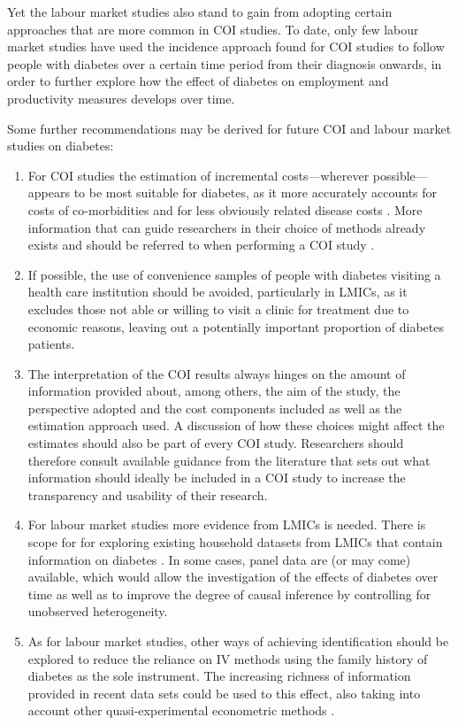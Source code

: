 Yet the labour market studies also stand to gain from adopting certain approaches that are more common in \ac{COI} studies. To date, only few labour market studies have used the incidence approach found for \ac{COI} studies to follow people with diabetes over a certain time period from their diagnosis onwards, in order to further explore how the effect of diabetes on employment and productivity measures develops over time.

Some further recommendations may be derived for future \ac{COI} and labour market studies on diabetes: 
\begin{enumerate}


\item	For \ac{COI} studies the estimation of incremental costs---wherever possible---appears to be most suitable for diabetes, as it more accurately accounts for costs of co-morbidities  and for less obviously related disease costs \parencite{Honeycutt2009a,Tunceli2010c}. More information that can guide researchers in their choice of methods already exists and should be referred to when performing a \ac{COI} study \parencite{Akobundu2006}.

\item	If possible, the use of convenience samples of people with diabetes visiting a health care institution should be avoided, particularly in \acp{LMIC}, as it excludes those not able or willing to visit a clinic for treatment due to economic reasons, leaving out a potentially important proportion of diabetes patients.

\item	The interpretation of the \ac{COI} results always hinges on the amount of information provided about, among others, the aim of the study, the perspective adopted and the cost components included as well as the estimation approach used. A discussion of how these choices might affect the estimates should also be part of every \ac{COI} study. Researchers should therefore consult available guidance from the literature that sets out what information should ideally be included in a \ac{COI} study \parencite{Larg2011} to increase the transparency and usability of their research. 

\item	For labour market studies more evidence from \acp{LMIC} is needed. There is scope for for exploring existing household datasets from \acp{LMIC} that contain information on diabetes \parencite{Seuring2014}. In some cases, panel data are (or may come) available, which would allow the investigation of the effects of diabetes over time as well as to improve the degree of causal inference by controlling for unobserved heterogeneity.

\item	As for labour market studies, other ways of achieving identification should be explored to reduce the reliance on \ac{IV} methods using the family history of diabetes as the sole instrument. The increasing richness of information provided in recent data sets could be used to this effect, also taking into account other quasi-experimental econometric methods \parencite{Craig2012}.
\end{enumerate}

